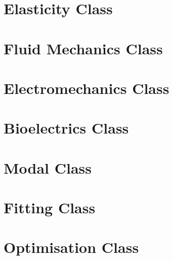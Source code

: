 \clearpage

%
\clearpage
%
\clearpage
%


\section{Elasticity Class}
\clearpage
%
\clearpage
%
\clearpage

\section{Fluid Mechanics Class}
\clearpage
%
\clearpage
%
\clearpage
%
\clearpage
%
\clearpage


\section{Electromechanics Class}
\clearpage
%
\clearpage
%
\clearpage
%



\section{Bioelectrics Class}
\clearpage
%
\clearpage
%
%

\section{Modal Class}
\clearpage

\section{Fitting Class}
\clearpage
%

\section{Optimisation Class}
\clearpage
